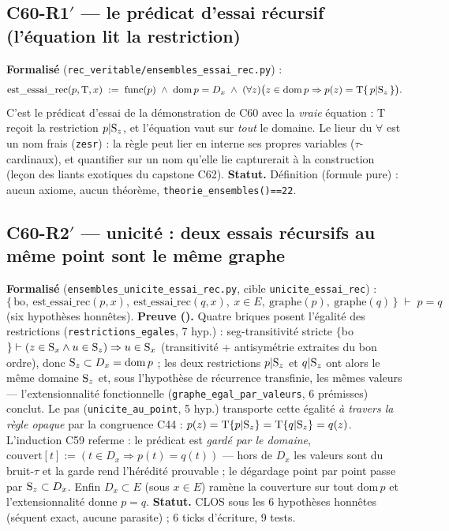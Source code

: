 \subsection{C60-R1$'$ --- le prédicat d'essai récursif (l'équation lit la restriction)}
\textbf{Formalisé} (\texttt{rec\_veritable/ensembles\_essai\_rec.py}) :
\[
  \mathrm{est\_essai\_rec}(p, \mathrm{T}, x) \;:=\;
  \mathrm{func}(p) \;\wedge\; \mathrm{dom}\,p = D_x \;\wedge\;
  (\forall z)\bigl(z \in \mathrm{dom}\,p \Rightarrow
    p(z) = \mathrm{T}\{\,p|\mathrm{S}_z\,\}\bigr).
\]
C'est le prédicat d'essai de la démonstration de C60 avec la \emph{vraie}
équation : $\mathrm{T}$ reçoit la restriction $p|\mathrm{S}_z$, et l'équation vaut sur
\emph{tout} le domaine. Le lieur du $\forall$ est un nom frais (\texttt{zesr}) :
la règle peut lier en interne ses propres variables ($\tau$-cardinaux), et
quantifier sur un nom qu'elle lie capturerait à la construction (leçon des
liants exotiques du capstone C62). \textbf{Statut.} Définition (formule pure) :
aucun axiome, aucun théorème, \texttt{theorie\_ensembles()==22}.

\subsection{C60-R2$'$ --- unicité : deux essais récursifs au même point sont le même graphe}
\textbf{Formalisé} (\texttt{ensembles\_unicite\_essai\_rec.py}, cible
\texttt{unicite\_essai\_rec}) :
\[
  \{\,\text{bo},\ \mathrm{est\_essai\_rec}(p, x),\ \mathrm{est\_essai\_rec}(q, x),\
     x \in E,\ \mathrm{graphe}(p),\ \mathrm{graphe}(q)\,\} \;\vdash\; p = q
\]
(six hypothèses honnêtes).
\textbf{Preuve (\Nstar).} Quatre briques posent l'égalité des restrictions
(\texttt{restrictions\_egales}, 7 hyp.) : seg-transitivité stricte
$\{$bo$\} \vdash (z \in \mathrm{S}_x \wedge u \in \mathrm{S}_z) \Rightarrow u \in \mathrm{S}_x$
(transitivité + antisymétrie extraites du bon ordre), donc
$\mathrm{S}_z \subset D_x = \mathrm{dom}\,p$ ; les deux restrictions $p|\mathrm{S}_z$ et
$q|\mathrm{S}_z$ ont alors le même domaine $\mathrm{S}_z$ et, sous l'hypothèse de récurrence
transfinie, les mêmes valeurs --- l'extensionnalité fonctionnelle
(\texttt{graphe\_egal\_par\_valeurs}, 6 prémisses) conclut. Le pas
(\texttt{unicite\_au\_point}, 5 hyp.) transporte cette égalité \emph{à travers la
règle opaque} par la congruence C44 : $p(z) = \mathrm{T}\{p|\mathrm{S}_z\} =
\mathrm{T}\{q|\mathrm{S}_z\} = q(z)$. L'induction C59 referme : le prédicat est
\emph{gardé par le domaine}, $\mathrm{couvert}[t] := (t \in D_x \Rightarrow
p(t) = q(t))$ --- hors de $D_x$ les valeurs sont du bruit-$\tau$ et la garde rend
l'hérédité prouvable ; le dégardage point par point passe par
$\mathrm{S}_z \subset D_x$. Enfin $D_x \subset E$ (sous $x \in E$) ramène la
couverture sur tout $\mathrm{dom}\,p$ et l'extensionnalité donne $p = q$.
\textbf{Statut.} CLOS sous les 6 hypothèses honnêtes (séquent exact, aucune
parasite) ; 6 ticks d'écriture, 9 tests.

